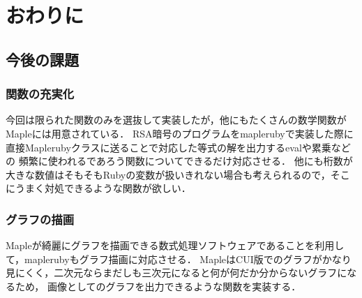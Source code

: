 \section{おわりに}
\subsection{今後の課題}
\subsubsection{関数の充実化}
今回は限られた関数のみを選抜して実装したが，他にもたくさんの数学関数がMapleには用意されている．
RSA暗号のプログラムをmaplerubyで実装した際に直接Maplerubyクラスに送ることで対応した等式の解を出力するevalや累乗などの
頻繁に使われるであろう関数についてできるだけ対応させる．
他にも桁数が大きな数値はそもそもRubyの変数が扱いきれない場合も考えられるので，そこにうまく対処できるような関数が欲しい．

\subsubsection{グラフの描画}
Mapleが綺麗にグラフを描画できる数式処理ソフトウェアであることを利用して，maplerubyもグラフ描画に対応させる．
MapleはCUI版でのグラフがかなり見にくく，二次元ならまだしも三次元になると何が何だか分からないグラフになるため，
画像としてのグラフを出力できるような関数を実装する．

